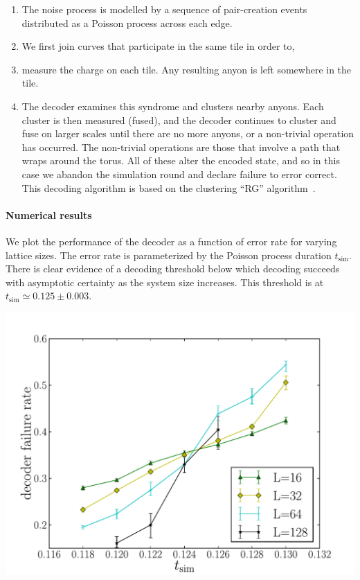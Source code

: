\documentclass[aps, prl, letterpaper, twocolumn, superscriptaddress, notitlepage]{revtex4-1}
\begin{document}
		\begin{enumerate}
			\item The noise process is modelled by a sequence of pair-creation events distributed as a Poisson process across each edge.
			\item We first join curves that participate in the same tile in order to,
			\item measure the charge on each tile. Any resulting anyon is left somewhere in the tile.
			\item The decoder examines this syndrome and clusters nearby anyons. Each cluster is then measured (fused), and the decoder continues to cluster and fuse on larger scales until there are no more anyons, or a non-trivial operation has occurred. The non-trivial operations are those that involve a path that wraps around the torus. All of these alter the encoded state, and so in this case we abandon the simulation round and declare failure to error correct. This decoding algorithm is based on the clustering ``RG'' algorithm~\cite{Bravyi2011}.
		\end{enumerate}


\paragraph{Numerical results}

	We plot the performance of the decoder as a function of error rate for varying lattice sizes. The error rate is parameterized by the Poisson process duration $t_{\mathrm{sim}}$. There is clear evidence of a decoding threshold below
which decoding succeeds with asymptotic certainty as the system size increases. This threshold is at $t_{\mathrm{sim}}\simeq 0.125 \pm 0.003.$

	\begin{center}\includegraphics[width=\columnwidth]{anyons-kyle.pdf}\end{center}
\end{document}
